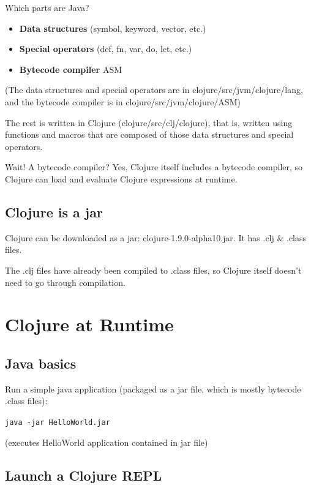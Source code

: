 \documentclass[11pt]{article}
\begin{document}
Which parts are Java?
\begin{itemize}
\item \textbf{Data structures} (symbol, keyword, vector, etc.)
\item \textbf{Special operators} (def, fn, var, do, let, etc.)
\item \textbf{Bytecode compiler} ASM
\end{itemize}

(The data structures and special operators are in clojure/src/jvm/clojure/lang,
and the bytecode compiler is in clojure/src/jvm/clojure/ASM)

The rest is written in Clojure (clojure/src/clj/clojure), that is,
written using functions and macros that are composed of
those data structures and special operators.

Wait! A bytecode compiler? Yes, Clojure itself includes a bytecode compiler,
so Clojure can load and evaluate Clojure expressions at runtime.

\subsection{Clojure is a jar}
\label{sec:orgheadline5}

Clojure can be downloaded as a jar: clojure-1.9.0-alpha10.jar.
It has .clj \& .class files.

The .clj files have already been compiled to .class files,
so Clojure itself doesn't need to go through compilation.

\section{Clojure at Runtime}
\label{sec:orgheadline10}

\subsection{Java basics}
\label{sec:orgheadline7}

Run a simple java application
(packaged as a jar file, which is mostly bytecode .class files):

\texttt{java -jar HelloWorld.jar}

(executes HelloWorld application contained in jar file)

\subsection{Launch a Clojure REPL}
\label{sec:orgheadline8}
\end{document}
